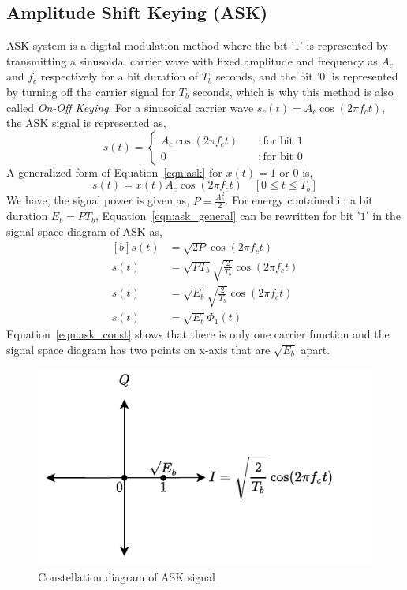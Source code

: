 \documentclass{lab_sheet}
\newcommand\ddfrac[2]{\frac{\displaystyle #1}{\displaystyle #2}}
\begin{document}
\subsection{Amplitude Shift Keying (ASK)}
ASK system is a digital modulation method where the bit '$1$' is represented by transmitting a sinusoidal carrier wave with fixed amplitude and frequency as $A_c$ and $f_c$ respectively for a bit duration of $T_b$ seconds, and the bit '$0$' is represented by turning off the carrier signal for $T_b$ seconds, which is why this method is also called \textit{On-Off Keying}. For a sinusoidal carrier wave $s_c(t)=A_c\cos(2\pi f_c t)$, the ASK signal is represented as,
\begin{equation}
    s(t)=\begin{cases}
        A_c\cos(2\pi f_c t)\quad &: \text{for bit } 1\\
        0 \quad &: \text{for bit } 0
    \end{cases}
    \label{eqn:ask}
\end{equation}
A generalized form of Equation~\ref{eqn:ask} for $x(t)=1 \text{ or } 0$ is,
\begin{equation}
    s(t)=x(t)A_c\cos(2\pi f_c t) \quad [0\leq t \leq T_b]
    \label{eqn:ask_general}
\end{equation}
We have, the signal power is given as, $P=\ddfrac{A_c^2}{2}$. For energy contained in a bit duration $E_b=PT_b$, Equation~\ref{eqn:ask_general} can be rewritten for bit '$1$' in the signal space diagram of ASK as,
\begin{equation}
    \begin{aligned}[b]
        s(t)&=\sqrt{2P} \cos(2\pi f_c t)\\
        s(t)&=\sqrt{PT_b} \sqrt{\frac{2}{T_b}} \cos(2\pi f_c t)\\
        s(t)&=\sqrt{E_b}\sqrt{\frac{2}{T_b}} \cos(2\pi f_c t)\\
        s(t)&=\sqrt{E_b} \Phi_1(t)
    \end{aligned}
    \label{eqn:ask_const}
\end{equation}
Equation~\ref{eqn:ask_const} shows that there is only one carrier function and the signal space diagram has two points on x-axis that are $\sqrt{E_b}$ apart.
\begin{figure}[H]
    \centering
    \includegraphics{../Figures/ask_const}
    \caption{Constellation diagram of ASK signal}
    \label{fig:ask_const}
\end{figure}
\end{document}
